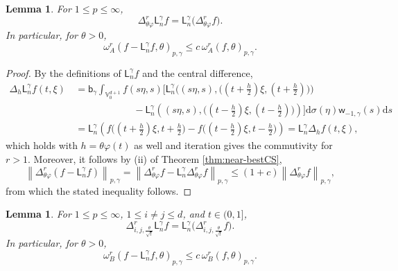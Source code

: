 \documentclass{amsart}
\newtheorem{lem}[thm]{Lemma}
\theoremstyle{remark}
\def\d{\mathrm{d}}
\def\g{{\gamma}}
\def\t{{\theta}}
\def\o{{\omega}}
\def\VV{{\mathbb V}}
\def\d{\mathrm{d}}
\def\sL{{\mathsf L}}
\def\sb{{\mathsf b}}
\def\sw{{\mathsf w}}
\def\g{{\gamma}}
\def\t{{\theta}}
\def\o{{\omega}}
\def\VV{{\mathbb V}}
\def\f{\frac}
\def\f{\frac}
\begin{document}
\begin{lem} \label{lem:triV=Vtri2}
For $1 \le p \le \infty$,   
$$
 	\Delta_{\theta\varphi}^r \sL_n^\g f = \sL_n^\g \Big(\Delta_{\theta\varphi}^r f \Big ).
$$
In particular, for $\t > 0$,
$$
 	\o_A^r  \left(f- \sL_n^\g f, \t\right)_{p,\g} \le c\, \o_A^r (f,\t)_{p, \g}.
$$
\end{lem}
 
\begin{proof}
By the definitions of $\sL_n^\g f$ and the central difference,   
\begin{align*}
 \Delta_{h} \sL_n^\g f(t, \xi) \, & =  \sb_\g \int_{\VV_0^{d+1}} f(s\eta,s)
     \big[\sL_{n}^{\gamma}\big ( (s\eta,s),\big((t+\tfrac h2)\xi,(t+\tfrac h2)\big)\big)   \\
&  \qquad\qquad\qquad  - \sL_{n}^{\gamma}\left( (s\eta,s),\big((t-\tfrac h2)\xi,(t-\tfrac h2)\big)\right) \big] 
         \d \sigma(\eta)\sw_{-1,\gamma}(s) \d s \\
& =\sL_n^\g \left( f\big((t+\tfrac h2) \xi,t+\tfrac h2\big) - f\big((t-\tfrac h2)\xi, t-\tfrac h2\big)\right) =
	 \sL_n^\g  \Delta_h f(t, \xi),
\end{align*} 
which holds with $h= \t \varphi(t)$ as well and iteration gives the commutivity for $r > 1$. Moreover,
it follows by (ii) of Theorem \ref{thm:near-bestCS}, 
$$
  \left \|\Delta_{\theta \varphi }^r ( f - \sL_n^\g f)\right\|_{p,\gamma} =  
      \left\|\Delta_{\theta \varphi}^r f - \sL_n^\g  \Delta_{\theta \varphi}^r  f\right \|_{p,\gamma}
 	\le (1+c) \left \|\Delta_{\theta \varphi}^r f \right \|_{p,\gamma},
 $$
 from which the stated inequality follows.
 \end{proof} 

\begin{lem} \label{lem:triV=Vtri}
For $1 \le p \le \infty$, $1 \le i\neq j\le d$, and $t\in(0,1]$, 
$$
	\Delta_{i,j,\f{\t}{\sqrt{t}}}^r \sL_n^\g f =   \sL_n^\g \Big(\Delta_{i,j,\f{\t}{\sqrt{t}}}^r f \Big ).
$$
In particular, for $\t > 0$,
$$
	\o_B^r  \left(f- \sL_n^\g f, \t\right)_{p,\g} \le c\, \o_B^r (f,\t)_{p, \g}.
$$
\end{lem}
\end{document}
